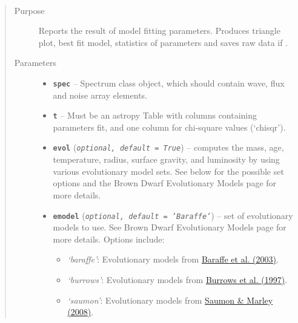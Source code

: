 \documentclass[letterpaper,10pt,english]{sphinxmanual}
\begin{document}

\begin{fulllineitems}
\label{splat_model:splat_model.reportModelFitResults}~\begin{quote}\begin{description}
\item[{Purpose}] \leavevmode
Reports the result of model fitting parameters.
Produces triangle plot, best fit model, statistics of parameters
and saves raw data if .

\item[{Parameters}] \leavevmode\begin{itemize}
\item {} 
\textbf{\texttt{spec}} -- Spectrum class object, which should contain wave, flux and
noise array elements.

\item {} 
\textbf{\texttt{t}} -- Must be an astropy Table with columns containing parameters fit, and one column for chi-square values (`chisqr').

\item {} 
\textbf{\texttt{evol}} (\emph{\texttt{optional, default = True}}) -- computes the mass, age, temperature, radius, surface gravity, and luminosity
by using various evolutionary model sets. See below for the possible set
options and the Brown Dwarf Evolutionary Models page for more details.

\item {} 
\textbf{\texttt{emodel}} (\emph{\texttt{optional, default = 'Baraffe'}}) -- 
set of evolutionary models to use. See Brown Dwarf Evolutionary Models page for
more details. Options include:
\begin{itemize}
\item {} 
\emph{`baraffe'}: Evolutionary models from \href{http://arxiv.org/abs/astro-ph/0302293}{Baraffe et al. (2003)}.

\item {} 
\emph{`burrows'}: Evolutionary models from \href{http://adsabs.harvard.edu/abs/1997ApJ...491..856B}{Burrows et al. (1997)}.

\item {} 
\emph{`saumon'}: Evolutionary models from \href{http://adsabs.harvard.edu/abs/2008ApJ...689.1327S}{Saumon \& Marley (2008)}.


\end{itemize}
\end{itemize}
\end{description}
\end{quote}
\end{fulllineitems}
\end{document}
